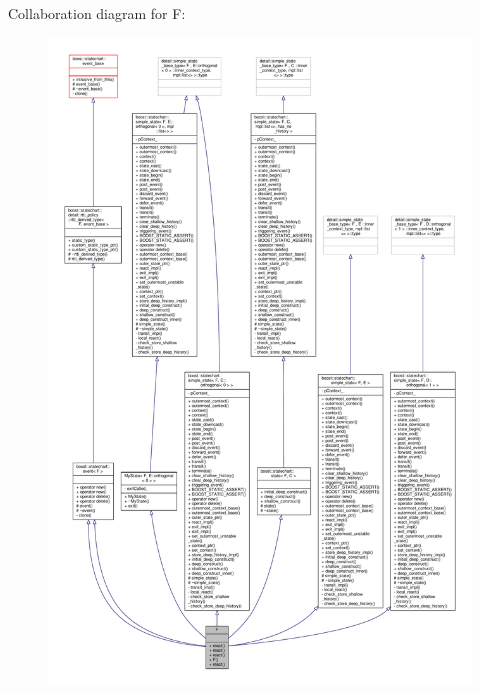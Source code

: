 Collaboration diagram for F\+:
\nopagebreak
\begin{figure}[H]
\begin{center}
\leavevmode
\includegraphics[width=350pt]{struct_f__coll__graph}
\end{center}
\end{figure}
